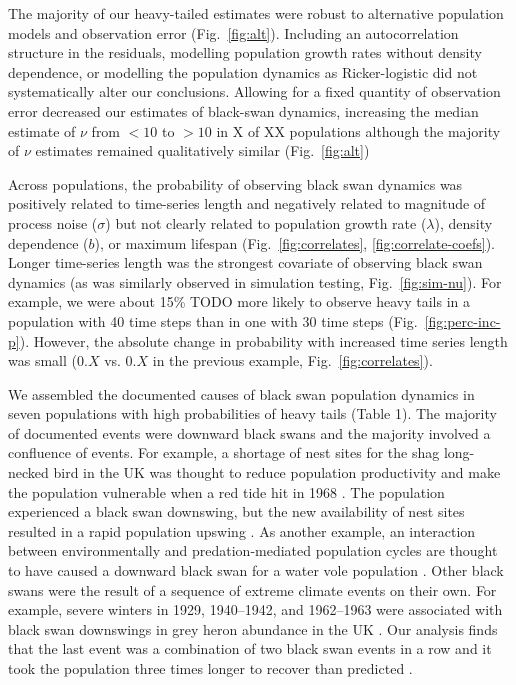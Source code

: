 The majority of our heavy-tailed estimates were robust to alternative
population models and observation error (Fig.~\ref{fig:alt}). Including an
autocorrelation structure in the residuals, modelling population growth rates
without density dependence, or modelling the population dynamics as
Ricker-logistic did not systematically alter our conclusions. Allowing for
a fixed quantity of observation error decreased our estimates of black-swan
dynamics, increasing the median estimate of $\nu$ from $<10$ to $>10$ in X of
XX populations although the majority of $\nu$ estimates remained qualitatively
similar (Fig.~\ref{fig:alt})

Across populations, the probability of observing black swan dynamics was
positively related to time-series length and negatively related to magnitude of
process noise ($\sigma$) but not clearly related to population growth rate
($\lambda$), density dependence ($b$), or maximum lifespan
(Fig.~\ref{fig:correlates}, \ref{fig:correlate-coefs}). Longer time-series
length was the strongest covariate of observing black swan dynamics (as was
similarly observed in simulation testing, Fig.~\ref{fig:sim-nu}). For example,
we were about 15\% TODO more likely to observe heavy tails in a population with
40 time steps than in one with 30 time steps (Fig.~\ref{fig:perc-inc-p}).
However, the absolute change in probability with increased time series length
was small ($0.X$ vs. $0.X$ in the previous example, Fig.~\ref{fig:correlates}).

We assembled the documented causes of black swan population dynamics in seven
populations with high probabilities of heavy tails (Table 1). The majority of
documented events were downward black swans and the majority involved
a confluence of events. For example, a shortage of nest sites for the shag
long-necked bird in the UK was thought to reduce population productivity and
make the population vulnerable when a red tide hit in 1968 \citep{potts1980}.
The population experienced a black swan downswing, but the new availability of
nest sites resulted in a rapid population upswing \citep{potts1980}. As
another example, an interaction between environmentally and predation-mediated
population cycles are thought to have caused a downward black swan for a water
vole population \citep{saucy1994}. Other black swans were the result of
a sequence of extreme climate events on their own. For example, severe winters
in 1929, 1940--1942, and 1962--1963 were associated with black swan downswings
in grey heron abundance in the UK \citep{stafford1971}. Our analysis finds
that the last event was a combination of two black swan events in a row and it
took the population three times longer to recover than predicted
\citep{stafford1971}.

